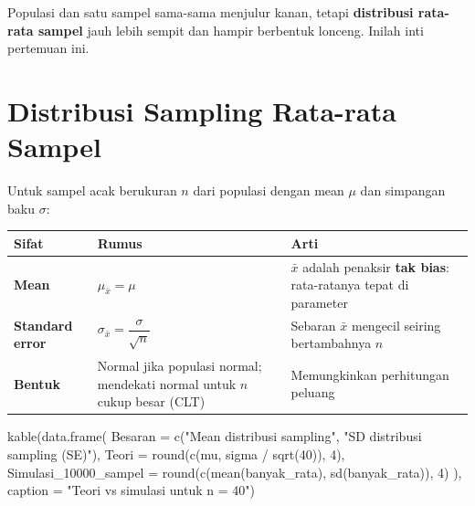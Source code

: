 \documentclass[
  indonesian,
  letterpaper,
]{book}
\newenvironment{Shaded}{\begin{snugshade}}{\end{snugshade}}
\newcommand{\AttributeTok}[1]{\textcolor[rgb]{0.40,0.45,0.13}{#1}}
\newcommand{\DecValTok}[1]{\textcolor[rgb]{0.68,0.00,0.00}{#1}}
\newcommand{\FunctionTok}[1]{\textcolor[rgb]{0.28,0.35,0.67}{#1}}
\newcommand{\NormalTok}[1]{\textcolor[rgb]{0.00,0.23,0.31}{#1}}
\newcommand{\SpecialCharTok}[1]{\textcolor[rgb]{0.37,0.37,0.37}{#1}}
\newcommand{\StringTok}[1]{\textcolor[rgb]{0.13,0.47,0.30}{#1}}
\newcounter{none} %
\begin{document}
Populasi dan satu sampel sama-sama menjulur kanan, tetapi
\textbf{distribusi rata-rata sampel} jauh lebih sempit dan hampir
berbentuk lonceng. Inilah inti pertemuan ini.

\section{Distribusi Sampling Rata-rata
Sampel}\label{distribusi-sampling-rata-rata-sampel}

Untuk sampel acak berukuran \(n\) dari populasi dengan mean \(\mu\) dan
simpangan baku \(\sigma\):

{\def\LTcaptype{none} %
\begin{longtable}[]{@{}
  >{\raggedright\arraybackslash}p{}
  >{\raggedright\arraybackslash}p{}
  >{\raggedright\arraybackslash}p{}@{}}
\toprule\noalign{}
\begin{minipage}[b]{\linewidth}\raggedright
Sifat
\end{minipage} & \begin{minipage}[b]{\linewidth}\raggedright
Rumus
\end{minipage} & \begin{minipage}[b]{\linewidth}\raggedright
Arti
\end{minipage} \\
\midrule\noalign{}
\endhead
\bottomrule\noalign{}
\endlastfoot
\textbf{Mean} & \(\mu_{\bar{x}} = \mu\) & \(\bar{x}\) adalah penaksir
\textbf{tak bias}: rata-ratanya tepat di parameter \\
\textbf{Standard error} &
\(\sigma_{\bar{x}} = \dfrac{\sigma}{\sqrt{n}}\) & Sebaran \(\bar{x}\)
mengecil seiring bertambahnya \(n\) \\
\textbf{Bentuk} & Normal jika populasi normal; mendekati normal untuk
\(n\) cukup besar (CLT) & Memungkinkan perhitungan peluang \\
\end{longtable}
}

\begin{Shaded}
\begin{Highlighting}[]
\FunctionTok{kable}\NormalTok{(}\FunctionTok{data.frame}\NormalTok{(}
  \AttributeTok{Besaran =} \FunctionTok{c}\NormalTok{(}\StringTok{"Mean distribusi sampling"}\NormalTok{, }\StringTok{"SD distribusi sampling (SE)"}\NormalTok{),}
  \AttributeTok{Teori   =} \FunctionTok{round}\NormalTok{(}\FunctionTok{c}\NormalTok{(mu, sigma }\SpecialCharTok{/} \FunctionTok{sqrt}\NormalTok{(}\DecValTok{40}\NormalTok{)), }\DecValTok{4}\NormalTok{),}
  \AttributeTok{Simulasi\_10000\_sampel =} \FunctionTok{round}\NormalTok{(}\FunctionTok{c}\NormalTok{(}\FunctionTok{mean}\NormalTok{(banyak\_rata), }\FunctionTok{sd}\NormalTok{(banyak\_rata)), }\DecValTok{4}\NormalTok{)}
\NormalTok{), }\AttributeTok{caption =} \StringTok{"Teori vs simulasi untuk n = 40"}\NormalTok{)}
\end{Highlighting}
\end{Shaded}
\end{document}
